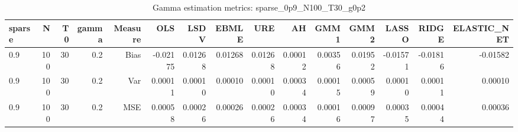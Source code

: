 \begin{table}[!htbp]\centering
\caption{Gamma estimation metrics: sparse_0p9_N100_T30_g0p2}
\label{tab:table1_sparse_0p9_N100_T30_g0p2}
\begin{tabular}{lrrrrrrrrrrrrrr}
\hline
sparse & N & T0 & gamma & Measure & OLS & LSDV & EBMLE & URE & AH & GMM1 & GMM2 & LASSO & RIDGE & ELASTIC_NET \\
\hline
0.9 & 100 & 30 & 0.2 & Bias & -0.02175 & 0.01268 & 0.01268 & 0.01268 & 0.00012 & 0.00356 & 0.01952 & -0.01571 & -0.01816 & -0.01582 \\
0.9 & 100 & 30 & 0.2 & Var & 0.00011 & 0.00010 & 0.00010 & 0.00010 & 0.00034 & 0.00015 & 0.00059 & 0.00010 & 0.00011 & 0.00010 \\
0.9 & 100 & 30 & 0.2 & MSE & 0.00058 & 0.00026 & 0.00026 & 0.00026 & 0.00034 & 0.00016 & 0.00097 & 0.00035 & 0.00044 & 0.00036 \\
\hline
\end{tabular}
\end{table}

